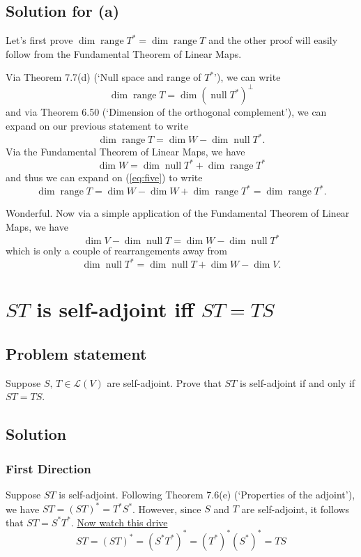 \documentclass{article}
\begin{document}
\subsection*{Solution for (a)}
Let's first prove $\operatorname{dim}\operatorname{range}T^*=\operatorname{dim}\operatorname{range}T$ and the other proof will easily follow from the Fundamental Theorem of Linear Maps.

Via Theorem 7.7(d) (`Null space and range of $T^*$'), we can write
\[\operatorname{dim}\operatorname{range}T=\operatorname{dim}(\operatorname{null}T^*)^\bot\]
and via Theorem 6.50 (`Dimension of the orthogonal complement'), we can expand on our previous statement to write
\begin{equation}\label{eq:five}
    \operatorname{dim}\operatorname{range}T=\operatorname{dim}W-\operatorname{dim}\operatorname{null}T^*.
\end{equation}
Via the Fundamental Theorem of Linear Maps, we have
\[\operatorname{dim}W=\operatorname{dim}\operatorname{null}T^*+\operatorname{dim}\operatorname{range}T^*\]
and thus we can expand on (\ref{eq:five}) to write
\[\operatorname{dim}\operatorname{range}T=\operatorname{dim}W-\operatorname{dim}W+\operatorname{dim}\operatorname{range}T^*=\operatorname{dim}\operatorname{range}T^*.\]

Wonderful. Now via a simple application of the Fundamental Theorem of Linear Maps, we have
\[\operatorname{dim}V-\operatorname{dim}\operatorname{null}T=\operatorname{dim}W-\operatorname{dim}\operatorname{null}T^*\]
which is only a couple of rearrangements away from 
\[\operatorname{dim}\operatorname{null}T^*=\operatorname{dim}\operatorname{null}T+\operatorname{dim}W-\operatorname{dim}V.\]

\clearpage

\renewcommand{\thesection}{7}
\section{$ST$ is self-adjoint iff $ST=TS$}
\subsection*{Problem statement}
Suppose $S,\,T\in\mathcal{L}(V)$ are self-adjoint. Prove that $ST$ is self-adjoint if and only if $ST=TS$.

\subsection*{Solution}
\subsubsection*{First Direction}
Suppose $ST$ is self-adjoint. Following Theorem 7.6(e) (`Properties of the adjoint'), we have $ST=(ST)^*=T^*S^*$. However, since $S$ and $T$ are self-adjoint, it follows that $ST=S^*T^*$. \href{https://www.youtube.com/watch?v=TCm9788Tb5g}{Now watch this drive}
\[ST=(ST)^*=(S^*T^*)^*=(T^*)^*(S^*)^*=TS\]
\end{document}
